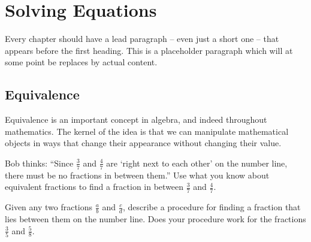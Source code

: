 \chapter{Solving Equations}
\label{ch:equations}



Every chapter should have a lead paragraph -- even just a short one -- that appears before the first heading. This is a placeholder paragraph which will at some point be replaces by actual content.

\section{Equivalence}
\label{sec:equivalence}

Equivalence is an important concept in algebra, and indeed throughout mathematics. The kernel of the idea is that we can manipulate mathematical objects in ways that change their appearance without changing their value.

\begin{boxedexplore}
Bob thinks: ``Since $\frac{3}{7}$ and $\frac{4}{7}$ are `right next to each other' on the number line, there must be no fractions in between them.'' Use what you know about equivalent fractions to find a fraction in between $\frac{3}{7}$ and $\frac{4}{7}$.

Given any two fractions $\frac{a}{b}$ and $\frac{c}{d}$, describe a procedure for finding a fraction that lies between them on the number line. Does your procedure work for the fractions $\frac{3}{5}$ and $\frac{5}{8}$.
\end{boxedexplore} %

\begin{boxedexplore}
\end{boxedexplore}

